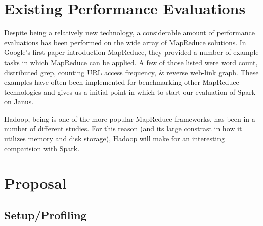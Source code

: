 \documentclass{article}
\begin{document}
\section*{Existing Performance Evaluations }
Despite being a relatively new technology, a considerable amount of performance
evaluations has been performed on the wide array of MapReduce solutions.
In Google's first paper introduction MapReduce, they provided a number of
example tasks in which MapReduce can be applied. A few of those listed were
word count, distributed grep, counting URL access frequency, \& reverse web-link
graph\citep{dean-mapreduce}. These examples have often been implemented for
benchmarking other MapReduce technologies and gives us a initial point in which
to start our evaluation of Spark on Janus.

Hadoop, being is one of the more popular MapReduce frameworks, has been in a
number of different studies. For this reason (and its large constrast in how
it utilizes memory and disk storage), Hadoop will make for an interesting
comparision with Spark.




\section*{Proposal}

\subsection*{Setup/Profiling}
\end{document}

